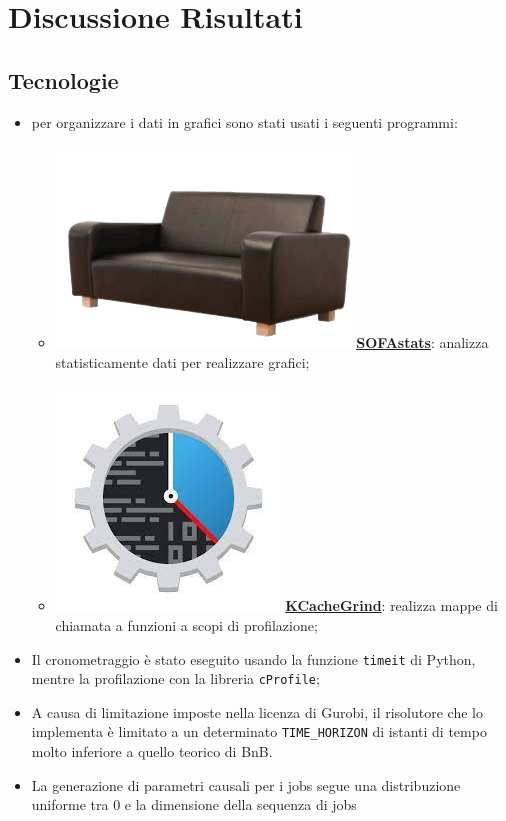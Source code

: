 \documentclass[compress]{beamer}
\begin{document}
\section{Discussione Risultati}

    \subsection{Tecnologie}
    \begin{frame}{\subsecname}
        \begin{itemize}
            \item per organizzare i dati in grafici sono stati usati i seguenti programmi:
            \begin{itemize}
                \item \includegraphics[scale=0.1]{figs/sofastatsLogo.png} \href{https://www.sofastatistics.com/home.php}{\textbf{SOFAstats}}:
                analizza statisticamente dati per realizzare grafici;
                \item \includegraphics[scale=0.1]{figs/kCacheGrindLogo.jpg} \href{https://www.gnuplot.info/}{\textbf{KCacheGrind}}: realizza mappe di chiamata 
                a funzioni a scopi di profilazione;
            \end{itemize}
            \item Il cronometraggio è stato eseguito usando la funzione \texttt{timeit} di Python,
            mentre la profilazione con la libreria \texttt{cProfile};
            \item A causa di limitazione imposte nella licenza di Gurobi, il risolutore che lo
            implementa è limitato a un determinato \texttt{TIME\_HORIZON} di istanti di tempo
            molto inferiore a quello teorico di BnB.
            \item La generazione di parametri causali per i jobs segue una distribuzione uniforme tra
            0 e la dimensione della sequenza di jobs

        \end{itemize}
    \end{frame}
\end{document}
